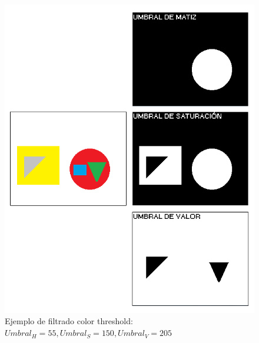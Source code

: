 {		\begin{figure}[htbp]
		\centering
		\includegraphics[scale=0.47]{graphics/colorthreshold.png}
		\caption{Ejemplo de filtrado color threshold: $Umbral_{H} = 55, Umbral_{S} = 150, Umbral_{V} = 205$}
		\label{fig:colorthres1}
		\end{figure}
	
}
